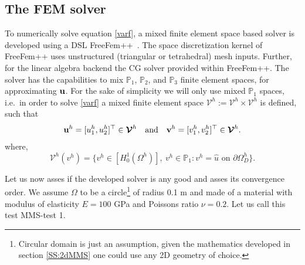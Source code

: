 \documentclass{report}
\newcommand{\bu}{\textbf{u}}
\newcommand{\bv}{\textbf{v}}
\def\bu{{\bf{u}}}
\def\bv{{\bf{v}}}
\begin{document}
\subsection{The FEM solver}
To numerically solve equation \eqref{varf}, 
a mixed finite element space based solver is developed using a DSL FreeFem++~\cite{hecht2012new}. The  space discretization kernel of FreeFem++ uses unstructured (triangular or tetrahedral)  mesh inputs. Further, for the linear algebra backend the CG solver provided within FreeFem++. The solver has the capabilities to mix $\mathbb{P}_1$, $\mathbb{P}_2$, and $\mathbb{P}_3$ finite element spaces, for approximating $\bu$. For the sake of simplicity we will only use mixed $\mathbb{P}_1$ spaces, i.e.~in order to solve  \eqref{varf} a mixed finite element space $\boldsymbol{\mathcal{V}}^h:=\mathcal{V}^h\times\mathcal{V}^h$ is defined, such that  $$\bu^h=[u_1^h,u_2^h]^\top\in\boldsymbol{\mathcal{V}}^h\quad\text{and}\quad\bv^h=[v_1^h,v_2^h]^\top\in\boldsymbol{\mathcal{V}}^h.$$ where, $$\mathcal{V}^h({v}^h)=\{{v}^h \in [H^1_0(\Omega^h)], ~{v}^h\in\mathbb{P}_1:{v}^h=\widehat{u} \text{~on~} \partial\Omega^h_D\}.$$

Let us now asses if the developed solver is any good and asses its convergence order. We assume $\Omega$ to be a circle\footnote{Circular domain is  just an assumption, given the mathematics developed in section \ref{SS:2dMMS} one could use any 2D geometry of choice.} of radius 0.1 m and made of a material with modulus of elasticity $E=100$ GPa and Poissons ratio $\nu=0.2$. Let us call this test MMS-test 1. 
\end{document}
